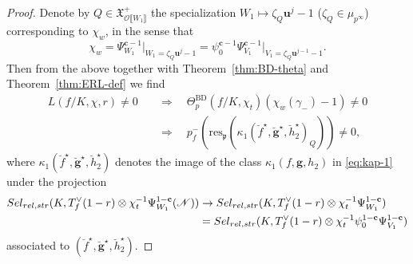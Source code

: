 \documentclass[10pt,letterpaper]{amsart}
\theoremstyle{plain}
\theoremstyle{definition}
\theoremstyle{definition}
\theoremstyle{plain}
\theoremstyle{plain}
\theoremstyle{plain}
\theoremstyle{remark}
\numberwithin{equation}{section}
\newcommand{\cc}{\mathbf{c}}
\newcommand{\vv}{\mathbf{v}}
\newcommand{\ch}{\xi}
\newcommand{\Sel}{Sel}
\newcommand{\pp}{\mathfrak{p}}
\newcommand{\fkf}{\mathfrak{f}}
\newcommand{\relstr}{{{\rm rel},{\rm str}}}
\DeclareMathOperator{\BD}{BD} %
\def\cO{\mathcal O}
\def\Sel{{\rm Sel}}
\newcommand{\dBr}[1]{\llbracket{#1}\rrbracket}
\newcommand{\bff}{{\boldsymbol{f}}}
\newcommand{\bfg}{{\boldsymbol{g}}}
\newcommand{\bfh}{{\boldsymbol{h}}}
\begin{document}
\begin{proof}
Denote by $Q\in\mathfrak{X}_{\cO\dBr{W_1}}^{+}$ the specialization $W_1\mapsto\zeta_Q\mathbf{u}^{j}-1$  ($\zeta_Q\in\mu_{p^\infty}$)  corresponding to $\chi_w$, in the sense that
\[
\chi_w=\Psi_{W_1}^{\cc-1}\vert_{W_1=\zeta_Q\mathbf{u}^j-1}=\psi_0^{\cc-1}\Psi_{V_1}^{\cc-1}\vert_{V_1=\zeta_Q\mathbf{u}^{j-1}-1}.
\]
Then from the above together with Theorem~\ref{thm:BD-theta} and Theorem~\ref{thm:ERL-def} we find
\begin{equation}\label{eq:L-implies-def}
\begin{aligned}
L(f/K,\chi,r)\neq 0\quad&\Longrightarrow\quad\Theta_p^{\BD}(f/K,\chi_t)(\chi_w(\gamma_-)-1)\neq 0\\
&\Longrightarrow\quad p_f^-({\mathrm{res}}_\pp(\kappa_1(\breve{f}^\star,\breve{\bfg}^\star,\breve{h}_2^\star)_Q))\neq 0,
\end{aligned}
\end{equation}
where $\kappa_1(\breve{f}^\star,\breve{\bfg}^\star,\breve{h}_2^\star)$
denotes the image of the class $\kappa_1(f,\bfg,h_2)$ in \eqref{eq:kap-1} under the projection
\begin{align*}
\Sel_{\relstr}(K,T_f^{\vee}(1-r)\otimes\chi_t^{-1}\Psi_{W_1}^{1-\cc}(\mathscr{N}))&\rightarrow\Sel_{\relstr}(K,T_f^{\vee}(1-r)\otimes\chi_t^{-1}\Psi_{W_1}^{1-\cc})\\
&=\Sel_{\relstr}(K,T_f^{\vee}(1-r)\otimes\chi_t^{-1}\psi_0^{1-\cc}\Psi_{V_1}^{1-\cc})
\end{align*}
associated to $(\breve{f}^\star,\breve{\bfg}^\star,\breve{h}_2^\star)$.
%
%


\end{proof}
\end{document}
